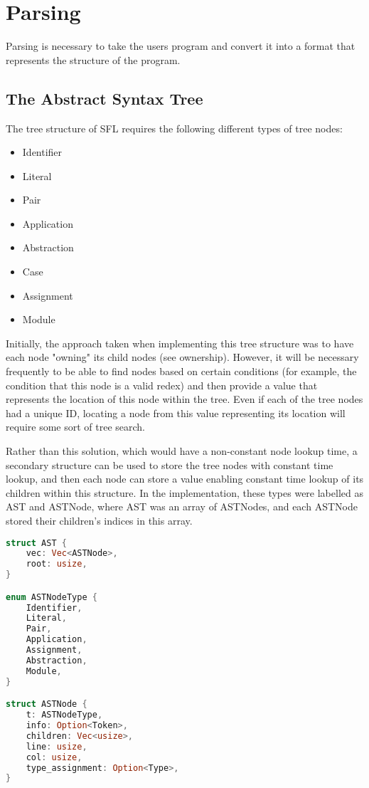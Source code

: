 \documentclass[
author={Kiran Sturt},
degree={BSc},
title={Implementing a Step by Step Evaluator for a Simple Functional Programming language},
unit={COMS30045},]{dissertation}
\theoremstyle{definition}
\theoremstyle{break}
\theoremstyle{definition}
\begin{document}
\section{Parsing}
Parsing is necessary to take the users program and convert it into a format that represents the structure of the program. 

\subsection{The Abstract Syntax Tree}
The tree structure of SFL requires the following different types of tree nodes:
\begin{itemize}
    \item Identifier
    \item Literal
    \item Pair
    \item Application
    \item Abstraction
    \item Case
    \item Assignment
    \item Module
\end{itemize}
Initially, the approach taken when implementing this tree structure was to have each node "owning" its child nodes (see ownership). However, it will be necessary frequently to be able to find nodes based on certain conditions (for example, the condition that this node is a valid redex) and then provide a value that represents the location of this node within the tree. Even if each of the tree nodes had a unique ID, locating a node from this value representing its location will require some sort of tree search.

Rather than this solution, which would have a non-constant node lookup time, a secondary structure can be used to store the tree nodes with constant time lookup, and then each node can store a value enabling constant time lookup of its children within this structure. In the implementation, these types were labelled as AST and ASTNode, where AST was an array of ASTNodes, and each ASTNode stored their children's indices in this array. 

\begin{lstlisting}[language=Rust]
struct AST {
    vec: Vec<ASTNode>,
    root: usize,
}

enum ASTNodeType {
    Identifier,
    Literal,
    Pair,
    Application,
    Assignment,
    Abstraction,
    Module,
}

struct ASTNode {
    t: ASTNodeType,
    info: Option<Token>,
    children: Vec<usize>,
    line: usize,
    col: usize,
    type_assignment: Option<Type>,
}
\end{lstlisting}
\end{document}
